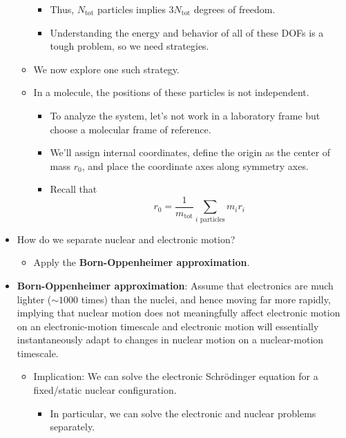 \documentclass[../notes.tex]{subfiles}
\begin{document}
\begin{itemize}
\begin{itemize}
\begin{itemize}
            \item Thus, $N_\text{tot}$ particles implies $3N_\text{tot}$ degrees of freedom.
            \item Understanding the energy and behavior of all of these DOFs is a tough problem, so we need strategies.
        \end{itemize}
        \item We now explore one such strategy.
        \item In a molecule, the positions of these particles is not independent.
        \begin{itemize}
            \item To analyze the system, let's not work in a laboratory frame but choose a molecular frame of reference.
            \item We'll assign internal coordinates, define the origin as the center of mass $r_0$, and place the coordinate axes along symmetry axes.
            \item Recall that
            \begin{equation*}
                r_0 = \frac{1}{m_\text{tot}}\sum_{i\text{ particles}}m_ir_i
            \end{equation*}
        \end{itemize}
    \end{itemize}
    \item How do we separate nuclear and electronic motion?
    \begin{itemize}
        \item Apply the \textbf{Born-Oppenheimer approximation}.
    \end{itemize}
    \item \textbf{Born-Oppenheimer approximation}: Assume that electronics are much lighter ($\sim 1000$ times) than the nuclei, and hence moving far more rapidly, implying that nuclear motion does not meaningfully affect electronic motion on an electronic-motion timescale and electronic motion will essentially instantaneously adapt to changes in nuclear motion on a nuclear-motion timescale.
    \begin{itemize}
        \item Implication: We can solve the electronic Schr\"{o}dinger equation for a fixed/static nuclear configuration.
        \begin{itemize}
            \item In particular, we can solve the electronic and nuclear problems separately.
        \end{itemize}

\end{itemize}
\end{itemize}
\end{document}
